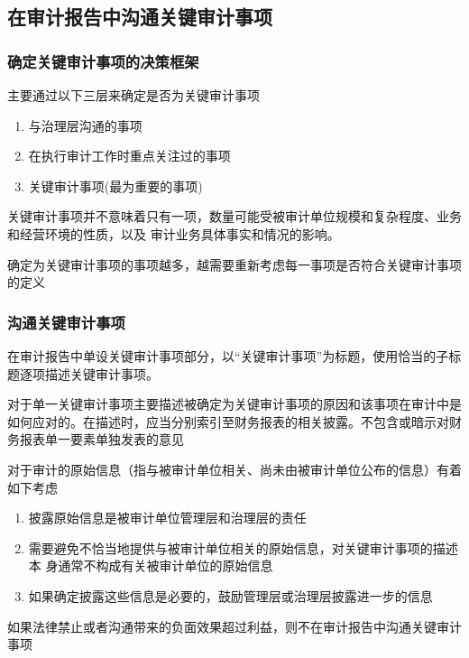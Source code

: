 \documentclass[UTF8,12pt]{ctexart}
\numberwithin{equation}{section} %
\numberwithin{figure}{section}
\numberwithin{table}{section}
\begin{document}
	\subsection{在审计报告中沟通关键审计事项}
	
	\subsubsection{确定关键审计事项的决策框架}
	主要通过以下三层来确定是否为关键审计事项
	\begin{enumerate}
		\item 与治理层沟通的事项
		
		\item 在执行审计工作时重点关注过的事项
		
		\item 关键审计事项(最为重要的事项)
	\end{enumerate}
	
	关键审计事项并不意味着只有一项，数量可能受被审计单位规模和复杂程度、业务和经营环境的性质，以及 审计业务具体事实和情况的影响。
	
	确定为关键审计事项的事项越多，越需要重新考虑每一事项是否符合关键审计事项的定义
	
	\subsubsection{沟通关键审计事项}
	在审计报告中单设关键审计事项部分，以“关键审计事项”为标题，使用恰当的子标题逐项描述关键审计事项。
	
	对于单一关键审计事项主要描述被确定为关键审计事项的原因和该事项在审计中是如何应对的。在描述时，应当分别索引至财务报表的相关披露。不包含或暗示对财务报表单一要素单独发表的意见
	
	对于审计的原始信息（指与被审计单位相关、尚未由被审计单位公布的信息）有着如下考虑
	\begin{enumerate}
		\item 披露原始信息是被审计单位管理层和治理层的责任 
		
		\item 需要避免不恰当地提供与被审计单位相关的原始信息，对关键审计事项的描述本 身通常不构成有关被审计单位的原始信息 
		
		\item 如果确定披露这些信息是必要的，鼓励管理层或治理层披露进一步的信息
	\end{enumerate}
	
	如果法律禁止或者沟通带来的负面效果超过利益，则不在审计报告中沟通关键审计事项
	
\end{document}
